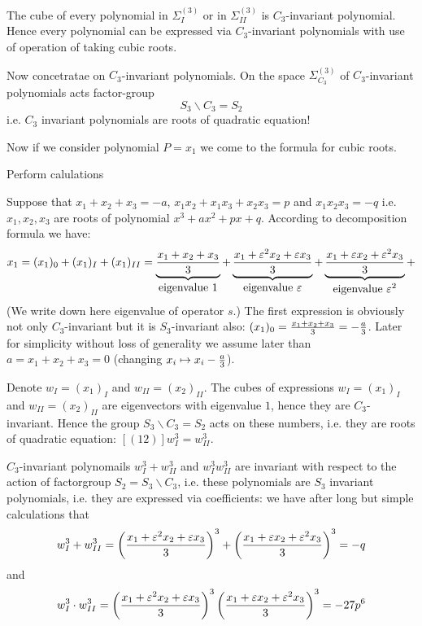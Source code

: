  The cube of every polynomial in $\Sigma^{(3)}_{I}$ or in
$\Sigma^{(3)}_{II}$ is $C_3$-invariant polynomial. Hence 
every polynomial can be expressed via $C_3$-invariant polynomials
with use of operation of taking cubic roots.

  Now concetratae on  $C_3$-invariant polynomials.
  On the space $\Sigma^{(3)}_{C_3}$ 
of $C_3$-invariant polynomials acts factor-group
        $$
      S_3\backslash C_3=S_2
        $$
 i.e. $C_3$ invariant polynomials are roots of quadratic equation!

Now if we consider polynomial $P=x_1$ we come to the formula for cubic roots.



Perform calulations

Suppose that $x_1+x_2+x_3=-a$, $x_1x_2+x_1x_3+x_2x_3=p$
and $x_1x_2x_3=-q$ i.e.
$x_1,x_2,x_3$ are roots of polynomial
$x^3+ax^2+px+q$.   According to decomposition formula  
 we have:
        $$
x_1=({x_1})_0+({x_1})_I+({x_1})_{II}=
\underbrace{x_1+ x_2+x_3\over 3}_{\hbox{eigenvalue $1$}}+
\underbrace{x_1+ \varepsilon^2 x_2+\varepsilon x_3\over 3}_{\hbox{eigenvalue $\varepsilon$}}+
\underbrace{x_1+ \varepsilon x_2+\varepsilon^2 x_3\over 3}_{\hbox{eigenvalue $\varepsilon^2$}}+
        $$
(We write down here eigenvalue of operator $s$.)
	The first expression is obviously not only $C_3$-invariant
but it is  $S_3$-invariant also:
$({x_1})_0={x_1+ x_2+x_3\over 3}=-{a\over 3}$.
Later  for simplicity without loss of generality 
we assume later than $a=x_1+x_2+x_3=0$
(changing $x_i\mapsto x_i-{a\over 3}$).

Denote $w_I=({x_1})_{I}$ and
$w_{II}=({x_2})_{II}$.
The cubes of expressions $w_I=({x_1})_{I}$ and
$w_{II}=({x_2})_{II}$ are eigenvectors with eigenvalue $1$, hence
they are $C_3$-invariant. Hence the group
  $S_3\backslash C_3=S_2$ acts on these numbers, i.e. they are roots
of quadratic equation:
  $[(12)]w^3_I=w^3_{II}$.

$C_3$-invariant 
polynomails $w^3_{I}+w^3_{II}$ and $w^3_{I}w^3_{II}$
are invariant with respect to the action of factorgroup 
$S_2=S_3\backslash C_3$, i.e. these polynomials 
are $S_3$ invariant polynomials, i.e. they are expressed 
via coefficients:
 we have after long but simple calculations that
       $$
w_I^3+w_{II}^3=
\left({x_1+ \varepsilon^2 x_2+\varepsilon x_3\over 3}\right)^3+
\left({x_1+ \varepsilon x_2+\varepsilon^2 x_3\over 3}\right)^3=-q
        $$
and    $$
w_I^3\cdot w_{II}^3=
\left({x_1+ \varepsilon^2 x_2+\varepsilon x_3\over 3}\right)^3
\left({x_1+ \varepsilon x_2+\varepsilon^2 x_3\over 3}\right)^3=-27p^6
        $$

